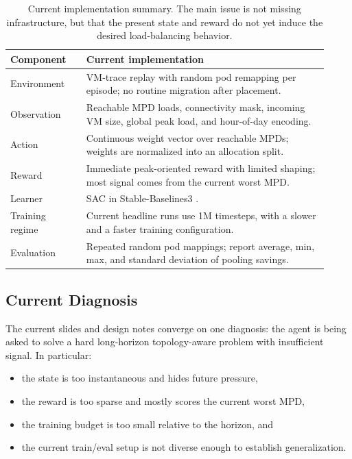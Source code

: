 \documentclass[11pt]{article}
\theoremstyle{definition}
\begin{document}
\begin{table}[H]
\centering
\small
\renewcommand{\arraystretch}{1.25}
\begin{tabular}{p{0.22\linewidth}p{0.70\linewidth}}
\toprule
\textbf{Component} & \textbf{Current implementation} \\
\midrule
Environment & VM-trace replay with random pod remapping per episode; no routine migration after placement. \\
Observation & Reachable MPD loads, connectivity mask, incoming VM size, global peak load, and hour-of-day encoding. \\
Action & Continuous weight vector over reachable MPDs; weights are normalized into an allocation split. \\
Reward & Immediate peak-oriented reward with limited shaping; most signal comes from the current worst MPD. \\
Learner & SAC in Stable-Baselines3 \cite{haarnoja2018sac,stable_baselines3}. \\
Training regime & Current headline runs use 1M timesteps, with a slower and a faster training configuration. \\
Evaluation & Repeated random pod mappings; report average, min, max, and standard deviation of pooling savings. \\
\bottomrule
\end{tabular}
\caption{Current implementation summary. The main issue is not missing
infrastructure, but that the present state and reward do not yet induce the
desired load-balancing behavior.}
\label{tab:current_impl}
\end{table}

\subsection{Current Diagnosis}

The current slides and design notes converge on one diagnosis: the agent is being
asked to solve a hard long-horizon topology-aware problem with insufficient
signal. In particular:
\begin{itemize}[nosep]
    \item the state is too instantaneous and hides future pressure,
    \item the reward is too sparse and mostly scores the current worst MPD,
    \item the training budget is too small relative to the horizon, and
    \item the current train/eval setup is not diverse enough to establish
    generalization.
\end{itemize}
\end{document}
